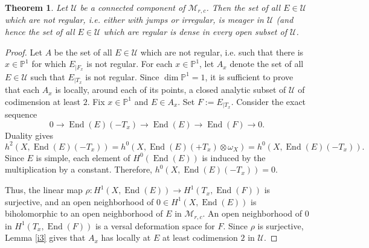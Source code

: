\documentclass[10pt,a4paper]{amsart}
\newtheorem{theorem}{Theorem}
\newcommand{\End}{\op{End}}
\newcommand{\Mm}{\enm{\cal{M}}}
\newcommand{\PP}{\enm{\mathbb{P}}}
\newcommand{\Uu}{\enm{\cal{U}}}
\newcommand{\cal}[1]{\mathcal{#1}}
\newcommand{\enm}[1]{\ensuremath{#1}}          %
\newcommand{\op}[1]{\operatorname{#1}}
\renewcommand{\to}[1][]{\xrightarrow{\ #1\ }}
\begin{document}
\begin{theorem}\label{i1}
Let $\Uu$ be a connected component of $\Mm_{r,c}$. Then the set of all $E\in \Uu$ which are not regular, i.e. either with jumps or irregular, is meager in $\Uu$
(and hence the set of all $E\in \Uu$ which are regular is dense in every open subset of $\Uu$.
\end{theorem}

\begin{proof}
Let $A$ be the set of all $E\in \Uu$ which are not regular, i.e. such that there is $x\in \PP^1$ for which $E_{|F_x}$ is not regular. For each $x\in \PP^1$, let  $A_x$ denote the set of all $E\in \Uu$ such that $E_{|T_x}$ is not regular.
Since $\dim \PP^1 =1$, it is sufficient to prove that each $A_x$ is locally, around each of its points,
 a closed analytic subset of $\Uu$ of codimension at least
$2$. Fix $x\in \PP^1$ and $E\in A_x$. Set $F:= E_{|T_x}$. Consider the exact sequence
\begin{equation}\label{eqd1}
0\to \End(E)(-T_x)\to \End(E)\to \End(F)\to 0 \text{.}
\end{equation}
Duality gives $$h^2(X,\End(E)(-T_x)) =h^0(X,\End(E)(+T_x)\otimes \omega_X) = h^0(X,\End(E)(-T_x)).$$ 
Since $E$ is simple, each element of $H^0(\End(E))$ is induced by the multiplication by a constant. Therefore, $h^0(X,\End(E)(-T_x))=0$.

Thus, the linear map $\rho\colon H^1(X,\End(E))\to H^1(T_x,\End(F))$ is surjective, and an open neighborhood
 of $0\in H^1(X,\End(E))$ is biholomorphic to an open neighborhood of $E$ in $\Mm_{r,c}$. An open neighborhood of $0$ in $H^1(T_x,\End(F))$ is a versal deformation space for $F$. Since $\rho$ is surjective, Lemma \ref{i3} gives that 
$A_x$ has locally at $E$ at least codimension $2$ in $\Uu$.
\end{proof}
\end{document}
